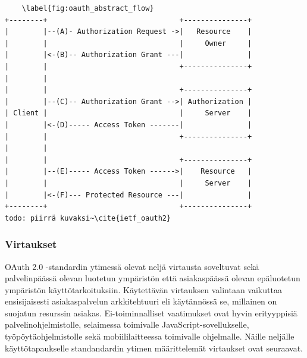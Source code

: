 \documentclass[finnish,gradu]{tktltiki}
\begin{document}
  \begin{singlespacing}
  \begin{verbatim}
    \label{fig:oauth_abstract_flow}
+--------+                               +---------------+
|        |--(A)- Authorization Request ->|   Resource    |
|        |                               |     Owner     |
|        |<-(B)-- Authorization Grant ---|               |
|        |                               +---------------+
|        |
|        |                               +---------------+
|        |--(C)-- Authorization Grant -->| Authorization |
| Client |                               |     Server    |
|        |<-(D)----- Access Token -------|               |
|        |                               +---------------+
|        |
|        |                               +---------------+
|        |--(E)----- Access Token ------>|    Resource   |
|        |                               |     Server    |
|        |<-(F)--- Protected Resource ---|               |
+--------+                               +---------------+
todo: piirrä kuvaksi~\cite{ietf_oauth2}
  \end{verbatim}
  \end{singlespacing}




  \subsubsection{Virtaukset} %
  \label{ssub:virtaukset}

  OAuth 2.0 -standardin ytimessä olevat neljä virtausta soveltuvat sekä palvelinpäässä olevan luotetun ympäristön että asiakaspäässä olevan epäluotetun ympäristön käyttötarkoituksiin. Käytettävän virtauksen valintaan vaikuttaa ensisijaisesti asiakaspalvelun arkkitehtuuri eli käytännössä se, millainen on suojatun resurssin asiakas. Ei-toiminnalliset vaatimukset ovat hyvin erityyppisiä palvelinohjelmistolle, selaimessa toimivalle JavaScript-sovellukselle, työpöytäohjelmistolle sekä mobiililaitteessa toimivalle ohjelmalle. Näille neljälle käyttötapaukselle standandardin ytimen määrittelemät virtaukset ovat seuraavat.
\end{document}
